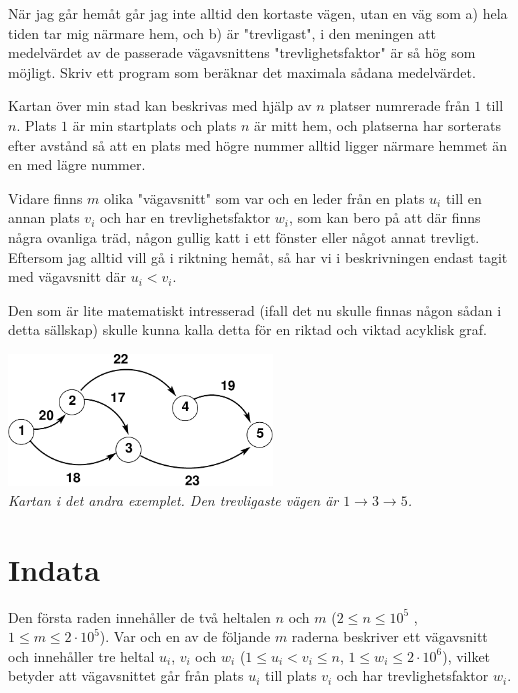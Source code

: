 När jag går hemåt går jag inte alltid den kortaste vägen, utan en väg som a) hela tiden tar mig närmare hem, och b) är "trevligast", i den meningen att medelvärdet av de passerade vägavsnittens "trevlighetsfaktor" är så hög som möjligt. Skriv ett program som beräknar det maximala sådana medelvärdet.

Kartan över min stad kan beskrivas med hjälp av $n$ platser numrerade från $1$ till $n$. Plats $1$ är min startplats och plats $n$ är mitt hem, och platserna har sorterats efter avstånd så att en plats med högre nummer alltid ligger närmare hemmet än en med lägre nummer.

Vidare finns $m$ olika "vägavsnitt" som var och en leder från en plats $u_i$ till en annan plats $v_i$ och har en trevlighetsfaktor $w_i$, som kan bero på att där finns några ovanliga träd, någon gullig katt i ett fönster eller något annat trevligt. Eftersom jag alltid vill gå i riktning hemåt, så har vi i beskrivningen endast tagit med vägavsnitt där $u_i<v_i$.

Den som är lite matematiskt intresserad (ifall det nu skulle finnas någon sådan i detta sällskap) skulle kunna kalla detta för en riktad och viktad acyklisk graf.

\includegraphics[width=7cm]{trevlig.pdf}\\
{\em Kartan i det andra exemplet. Den trevligaste vägen är $1\rightarrow 3\rightarrow 5$.}


\section*{Indata}
Den första raden innehåller de två heltalen $n$ och $m$ ($2 \leq n \leq 10^5$ , $1 \leq m \leq 2\cdot 10^5$).
Var och en av de följande $m$ raderna beskriver ett vägavsnitt och innehåller tre heltal $u_i$, $v_i$ och $w_i$ ($1 \leq u_i < v_i \leq n$, $1 \le w_i \le 2\cdot 10^6$),
vilket betyder att vägavsnittet går från plats $u_i$ till plats $v_i$ och har trevlighetsfaktor $w_i$.


